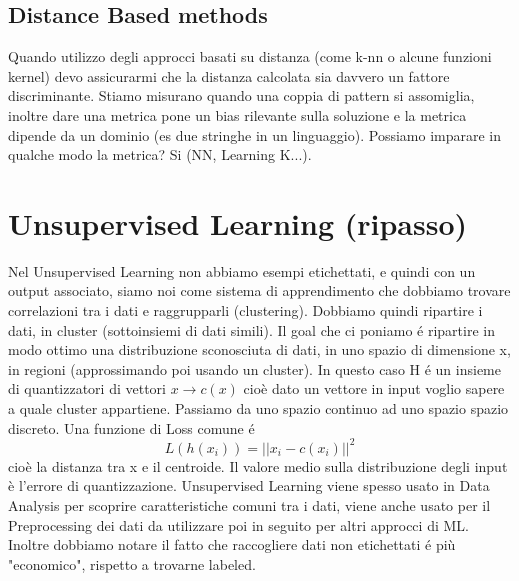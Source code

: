 \documentclass{article}
\begin{document}
\subsection{Distance Based methods}
Quando utilizzo degli approcci basati su distanza (come k-nn o alcune funzioni kernel) devo assicurarmi che la distanza calcolata sia davvero un fattore discriminante. Stiamo misurano quando una coppia di pattern si assomiglia, inoltre dare una metrica pone un bias rilevante sulla soluzione e la metrica dipende da un dominio (es due stringhe in un linguaggio). Possiamo imparare in qualche modo la metrica? Si (NN, Learning K...). 

\section{Unsupervised Learning (ripasso)}
Nel Unsupervised Learning non abbiamo esempi etichettati, e quindi con un output associato, siamo noi come sistema di apprendimento che dobbiamo trovare correlazioni tra i dati e raggrupparli (clustering). Dobbiamo quindi ripartire i dati, in cluster (sottoinsiemi di dati simili). Il goal che ci poniamo é ripartire in modo ottimo una distribuzione sconosciuta di dati, in uno spazio di dimensione x, in regioni (approssimando poi usando un cluster). In questo caso H é un insieme di quantizzatori di vettori $x\rightarrow c(x)$ cioè dato un vettore in input voglio sapere a quale cluster appartiene. Passiamo da uno spazio continuo ad uno spazio spazio discreto. \newline 
Una funzione di Loss comune é \[L(h(x_i))=||x_i-c(x_i)||^2\] cioè la distanza tra x e il centroide. Il valore medio sulla distribuzione degli input è l'errore di quantizzazione. \newline
Unsupervised Learning viene spesso usato in Data Analysis per scoprire caratteristiche comuni tra i dati, viene anche usato per il Preprocessing dei dati da utilizzare poi in seguito per altri approcci di ML. Inoltre dobbiamo notare il fatto che raccogliere dati non etichettati é più "economico", rispetto a trovarne labeled.
\end{document}
